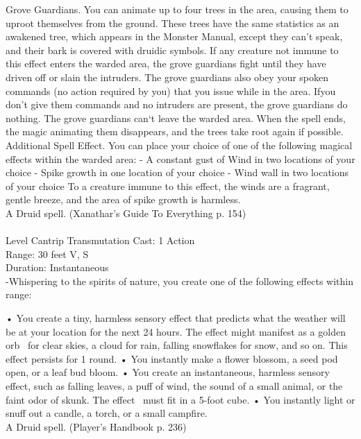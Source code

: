 \documentclass[10pt,twocolumn]{report}
\begin{document}
Grove Guardians. You can animate up to four trees in the area, causing them to uproot themselves from the ground. These trees have the same statistics as an awakened tree, which appears in the Monster Manual, except they can’t speak, and their bark is covered with druidic symbols. If any creature not immune to this effect enters the warded area, the grove guardians fight until they have driven off or slain the intruders. The grove guardians also obey your spoken commands (no action required by you) that you issue while in the area. Ifyou don't give them commands and no intruders are present, the grove guardians do nothing. The grove guardians can‘t leave the warded area. When the spell ends, the magic animating them disappears, and the trees take root again if possible.
Additional Spell Effect. You can place your choice of one of the following magical effects within the warded area: 
- A constant gust of Wind in two locations of your choice
- Spike growth in one location of your choice
- Wind wall in two locations of your choice
To a creature immune to this effect, the winds are a fragrant, gentle breeze, and the area of spike growth is harmless.\\
A Druid spell. (Xanathar's Guide To Everything p. 154) \\


 \\
Level Cantrip \quad Transmutation \quad Cast: 1 Action\\
Range: 30 feet \quad V, S\\
Duration: Instantaneous \quad \\
-Whispering to the spirits of nature, you create one of the following effects within range: 

• You create a tiny, harmless sensory effect that predicts what the weather will be at your location for the next 24 hours. The effect might manifest as a golden orb  for clear skies, a cloud for rain, falling snowflakes for snow, and so on. This effect persists for 1 round. 
• You instantly make a flower blossom, a seed pod open, or a leaf bud bloom. 
• You create an instantaneous, harmless sensory effect, such as falling leaves, a puff of wind, the sound of a small animal, or the faint odor of skunk. The effect  must fit in a 5-foot cube. 
• You instantly light or snuff out a candle, a torch, or a small campfire.\\
A Druid spell. (Player's Handbook p. 236) \\
\end{document}
